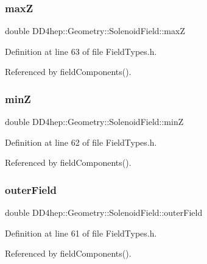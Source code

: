 \subsubsection{\texorpdfstring{maxZ}{maxZ}}
{\footnotesize\ttfamily double D\+D4hep\+::\+Geometry\+::\+Solenoid\+Field\+::maxZ}



Definition at line 63 of file Field\+Types.\+h.



Referenced by field\+Components().

\hypertarget{class_d_d4hep_1_1_geometry_1_1_solenoid_field_a51af6d29a975015b6f539d514ddc1000}{}\label{class_d_d4hep_1_1_geometry_1_1_solenoid_field_a51af6d29a975015b6f539d514ddc1000} 
\subsubsection{\texorpdfstring{minZ}{minZ}}
{\footnotesize\ttfamily double D\+D4hep\+::\+Geometry\+::\+Solenoid\+Field\+::minZ}



Definition at line 62 of file Field\+Types.\+h.



Referenced by field\+Components().

\hypertarget{class_d_d4hep_1_1_geometry_1_1_solenoid_field_a7a98e6f75ae53445e6b1dad2a4279ac9}{}\label{class_d_d4hep_1_1_geometry_1_1_solenoid_field_a7a98e6f75ae53445e6b1dad2a4279ac9} 
\subsubsection{\texorpdfstring{outer\+Field}{outerField}}
{\footnotesize\ttfamily double D\+D4hep\+::\+Geometry\+::\+Solenoid\+Field\+::outer\+Field}



Definition at line 61 of file Field\+Types.\+h.



Referenced by field\+Components().

\hypertarget{class_d_d4hep_1_1_geometry_1_1_solenoid_field_a4243bc378c9ad5c7021e9f8525691da9}{}\label{class_d_d4hep_1_1_geometry_1_1_solenoid_field_a4243bc378c9ad5c7021e9f8525691da9} 

